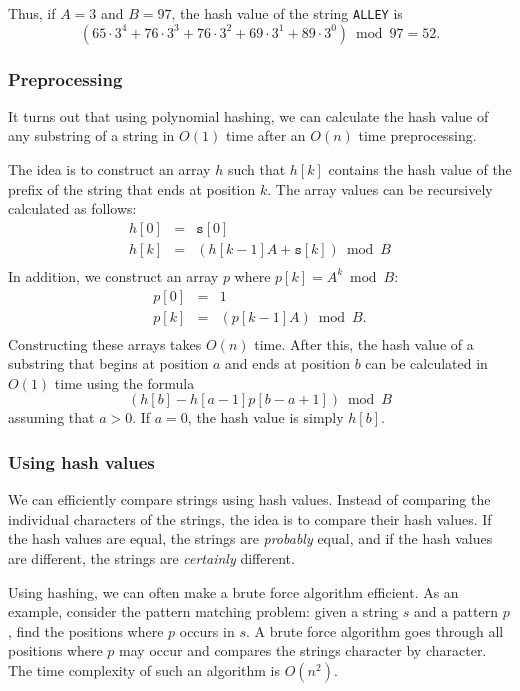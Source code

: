 Thus, if $A=3$ and $B=97$, the hash value
of the string \texttt{ALLEY} is
\[(65 \cdot 3^4 + 76 \cdot 3^3 + 76 \cdot 3^2 + 69 \cdot 3^1 + 89 \cdot 3^0) \bmod 97 = 52.\]

\subsubsection*{Preprocessing}

It turns out that using polynomial hashing,
we can calculate the hash value of any substring
of a string
in $O(1)$ time after an $O(n)$ time preprocessing.

The idea is to construct an array $h$ such that
$h[k]$ contains the hash value of the prefix
of the string that ends at position $k$.
The array values can be recursively calculated as follows:
\[
\begin{array}{lcl}
h[0] & = & \texttt{s}[0] \\
h[k] & = & (h[k-1] A + \texttt{s}[k]) \bmod B \\
\end{array}
\]
In addition, we construct an array $p$
where $p[k]=A^k \bmod B$:
\[
\begin{array}{lcl}
p[0] & = & 1 \\
p[k] & = & (p[k-1] A) \bmod B. \\
\end{array}
\]
Constructing these arrays takes $O(n)$ time.
After this, the hash value of a substring
that begins at position $a$ and ends at position $b$
can be calculated in $O(1)$ time using the formula
\[(h[b]-h[a-1] p[b-a+1]) \bmod B\]
assuming that $a>0$.
If $a=0$, the hash value is simply $h[b]$.

\subsubsection*{Using hash values}

We can efficiently compare strings using hash values.
Instead of comparing the individual characters of the strings,
the idea is to compare their hash values.
If the hash values are equal,
the strings are \emph{probably} equal,
and if the hash values are different,
the strings are \emph{certainly} different.

Using hashing, we can often make a brute force
algorithm efficient.
As an example, consider the pattern matching problem:
given a string $s$ and a pattern $p$,
find the positions where $p$ occurs in $s$.
A brute force algorithm goes through all positions
where $p$ may occur and compares the strings
character by character.
The time complexity of such an algorithm is $O(n^2)$.

